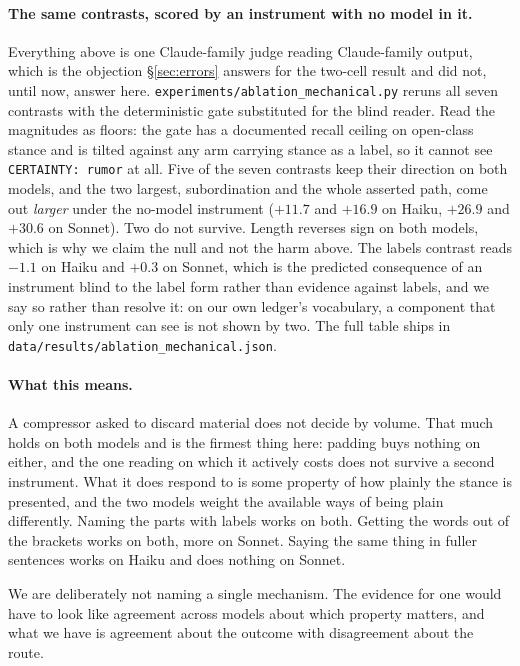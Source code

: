 \documentclass[11pt]{article}
\begin{document}
\paragraph{The same contrasts, scored by an instrument with no model in it.} Everything
above is one Claude-family judge reading Claude-family output, which is the objection
\S\ref{sec:errors} answers for the two-cell result and did not, until now, answer here.
\texttt{experiments/ablation\_mechanical.py} reruns all seven contrasts with the
deterministic gate substituted for the blind reader. Read the magnitudes as floors: the
gate has a documented recall ceiling on open-class stance and is tilted against any arm
carrying stance as a label, so it cannot see \texttt{CERTAINTY: rumor} at all. Five of the
seven contrasts keep their direction on both models, and the two largest, subordination
and the whole asserted path, come out \emph{larger} under the no-model instrument
($+11.7$ and $+16.9$ on Haiku, $+26.9$ and $+30.6$ on Sonnet). Two do not survive. Length
reverses sign on both models, which is why we claim the null and not the harm above. The
labels contrast reads $-1.1$ on Haiku and $+0.3$ on Sonnet, which is the predicted
consequence of an instrument blind to the label form rather than evidence against labels,
and we say so rather than resolve it: on our own ledger's vocabulary, a component that
only one instrument can see is not shown by two. The full table ships in
\texttt{data/results/ablation\_mechanical.json}.

\paragraph{What this means.} A compressor asked to discard material does not decide by
volume. That much holds on both models and is the firmest thing here: padding buys
nothing on either, and the one reading on which it actively costs does not survive a
second instrument. What it does respond to is some property
of how plainly the stance is presented, and the two models weight the available ways of
being plain differently. Naming the parts with labels works on both. Getting the words out
of the brackets works on both, more on Sonnet. Saying the same thing in fuller sentences
works on Haiku and does nothing on Sonnet.

We are deliberately not naming a single mechanism. The evidence for one would have to look
like agreement across models about which property matters, and what we have is agreement
about the outcome with disagreement about the route.
\end{document}
